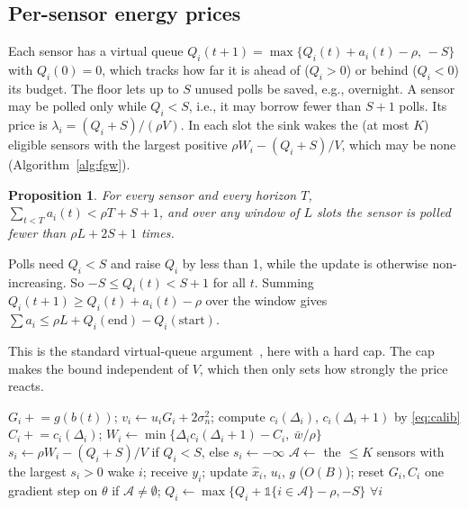 \documentclass[conference]{IEEEtran}
\newtheorem{proposition}{Proposition}
\begin{document}
\subsection{Per-sensor energy prices}
Each sensor has a virtual queue $Q_i(t+1)=\max\{Q_i(t)+a_i(t)-\rho,\,-S\}$ with
$Q_i(0)=0$, which tracks how far it is ahead of ($Q_i>0$) or behind ($Q_i<0$) its
budget. The floor lets up to $S$ unused polls be saved, e.g., overnight. A sensor
may be polled only while $Q_i<S$, i.e., it may borrow fewer than $S+1$ polls. Its
price is $\lambda_i=(Q_i+S)/(\rho V)$. In each slot the sink wakes the (at most
$K$) eligible sensors with the largest positive $\rho W_i-(Q_i+S)/V$, which may
be none (Algorithm~\ref{alg:fgw}).
\begin{proposition}\label{prop:budget}
For every sensor and every horizon $T$,
$\sum_{t<T}a_i(t)<\rho T+S+1$, and over any window of $L$ slots the sensor is
polled fewer than $\rho L+2S+1$ times.
\end{proposition}
\begin{IEEEproof}
Polls need $Q_i<S$ and raise $Q_i$ by less than 1, while the update is otherwise
non-increasing. So $-S\le Q_i(t)<S+1$ for all $t$. Summing
$Q_i(t+1)\ge Q_i(t)+a_i(t)-\rho$ over the window gives
$\sum a_i\le\rho L+Q_i(\text{end})-Q_i(\text{start})$.
\end{IEEEproof}
This is the standard virtual-queue argument~\cite{neely2010}, here with a hard
cap. The cap makes the bound independent of $V$, which then only sets how strongly
the price reacts.

\begin{algorithm}[t]
\caption{FG-Wake, executed by the sink in slot $t$}\label{alg:fgw}
\begin{algorithmic}[1]
 
\State $G_i\!\mathrel{+}=g(b(t))$;\; $v_i\gets u_iG_i+2\sigma_n^2$;\; compute $c_i(\Delta_i)$, $c_i(\Delta_i{+}1)$ by \eqref{eq:calib}
\State $C_i\!\mathrel{+}=c_i(\Delta_i)$;\; $W_i\gets\min\{\Delta_i c_i(\Delta_i{+}1)-C_i,\ \bar w/\rho\}$
\State $s_i\gets\rho W_i-(Q_i+S)/V$ if $Q_i<S$, else $s_i\gets-\infty$
\EndFor
\State $\mathcal{A}\gets$ the $\le K$ sensors with the largest $s_i>0$ 
 wake $i$; receive $y_i$; update $\hat x_i$, $u_i$, $g$ ($O(B)$); reset $G_i,C_i$
\EndFor
\State one gradient step on $\theta$ if $\mathcal{A}\neq\emptyset$; $Q_i\gets\max\{Q_i+\mathbb{1}\{i\in\mathcal{A}\}-\rho,-S\}$ $\forall i$
\end{algorithmic}
\end{algorithm}
\end{document}
